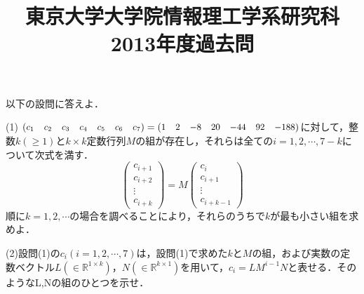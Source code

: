 \documentclass[a4j]{jarticle}
\title{東京大学大学院情報理工学系研究科2013年度過去問}
\author{}
\date{}
\begin{document}
\thispagestyle{empty}
\maketitle
\pagebreak

\section{}

\begin{screen}
 以下の設問に答えよ．
\end{screen}

\begin{screen}
 (1) $\small\begin{pmatrix}c_1&c_2&c_3&c_4&c_5&c_6&c_7 \end{pmatrix}=\small\begin{pmatrix}1&2&-8&20&-44&92&-188 \end{pmatrix}$に対して，整数$k(\geq 1)$と$k \times k$定数行列$M$の組が存在し，それらは全ての$i=1,2,\cdots,7-k$について次式を満す．
 $$\left(\begin{array}{c} c_{i+1}\\ c_{i+2} \\ \vdots \\ c_{i+k} \end{array} \right) =  M \left(\begin{array}{c} c_{i}\\ c_{i+1} \\ \vdots \\ c_{i+k-1} \end{array} \right)$$
 順に$k=1,2,\cdots$の場合を調べることにより，それらのうちで$k$が最も小さい組を求めよ．
\end{screen}

\begin{screen}
 (2)設問(1)の$c_i(i=1,2,\cdots,7)$は，設問(1)で求めた$k$と$M$の組，および実数の定数ベクトル$L(\in \mathbb{R}^{1\times k})$，$N(\in\mathbb{R}^{k \times 1})$を用いて，$c_i=LM^{i-1}N$と表せる．そのようなL,Nの組のひとつを示せ．
\end{screen}
\end{document}
